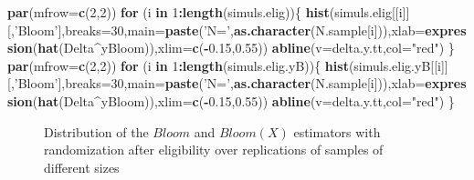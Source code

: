 \documentclass[]{book}
\newenvironment{Shaded}{\begin{snugshade}}{\end{snugshade}}
\newcommand{\ControlFlowTok}[1]{\textcolor[rgb]{0.13,0.29,0.53}{\textbf{#1}}}
\newcommand{\DataTypeTok}[1]{\textcolor[rgb]{0.13,0.29,0.53}{#1}}
\newcommand{\DecValTok}[1]{\textcolor[rgb]{0.00,0.00,0.81}{#1}}
\newcommand{\FloatTok}[1]{\textcolor[rgb]{0.00,0.00,0.81}{#1}}
\newcommand{\KeywordTok}[1]{\textcolor[rgb]{0.13,0.29,0.53}{\textbf{#1}}}
\newcommand{\NormalTok}[1]{#1}
\newcommand{\OperatorTok}[1]{\textcolor[rgb]{0.81,0.36,0.00}{\textbf{#1}}}
\newcommand{\StringTok}[1]{\textcolor[rgb]{0.31,0.60,0.02}{#1}}
\theoremstyle{definition}
\theoremstyle{definition}
\theoremstyle{definition}
\theoremstyle{remark}
\begin{document}
\begin{Shaded}
\begin{Highlighting}[]
\KeywordTok{par}\NormalTok{(}\DataTypeTok{mfrow=}\KeywordTok{c}\NormalTok{(}\DecValTok{2}\NormalTok{,}\DecValTok{2}\NormalTok{))}
\ControlFlowTok{for}\NormalTok{ (i }\ControlFlowTok{in} \DecValTok{1}\OperatorTok{:}\KeywordTok{length}\NormalTok{(simuls.elig))\{}
  \KeywordTok{hist}\NormalTok{(simuls.elig[[i]][,}\StringTok{'Bloom'}\NormalTok{],}\DataTypeTok{breaks=}\DecValTok{30}\NormalTok{,}\DataTypeTok{main=}\KeywordTok{paste}\NormalTok{(}\StringTok{'N='}\NormalTok{,}\KeywordTok{as.character}\NormalTok{(N.sample[i])),}\DataTypeTok{xlab=}\KeywordTok{expression}\NormalTok{(}\KeywordTok{hat}\NormalTok{(Delta}\OperatorTok{^}\NormalTok{yBloom)),}\DataTypeTok{xlim=}\KeywordTok{c}\NormalTok{(}\OperatorTok{-}\FloatTok{0.15}\NormalTok{,}\FloatTok{0.55}\NormalTok{))}
  \KeywordTok{abline}\NormalTok{(}\DataTypeTok{v=}\NormalTok{delta.y.tt,}\DataTypeTok{col=}\StringTok{"red"}\NormalTok{)}
\NormalTok{\}}
\KeywordTok{par}\NormalTok{(}\DataTypeTok{mfrow=}\KeywordTok{c}\NormalTok{(}\DecValTok{2}\NormalTok{,}\DecValTok{2}\NormalTok{))}
\ControlFlowTok{for}\NormalTok{ (i }\ControlFlowTok{in} \DecValTok{1}\OperatorTok{:}\KeywordTok{length}\NormalTok{(simuls.elig.yB))\{}
  \KeywordTok{hist}\NormalTok{(simuls.elig.yB[[i]][,}\StringTok{'Bloom'}\NormalTok{],}\DataTypeTok{breaks=}\DecValTok{30}\NormalTok{,}\DataTypeTok{main=}\KeywordTok{paste}\NormalTok{(}\StringTok{'N='}\NormalTok{,}\KeywordTok{as.character}\NormalTok{(N.sample[i])),}\DataTypeTok{xlab=}\KeywordTok{expression}\NormalTok{(}\KeywordTok{hat}\NormalTok{(Delta}\OperatorTok{^}\NormalTok{yBloom)),}\DataTypeTok{xlim=}\KeywordTok{c}\NormalTok{(}\OperatorTok{-}\FloatTok{0.15}\NormalTok{,}\FloatTok{0.55}\NormalTok{))}
  \KeywordTok{abline}\NormalTok{(}\DataTypeTok{v=}\NormalTok{delta.y.tt,}\DataTypeTok{col=}\StringTok{"red"}\NormalTok{)}
\NormalTok{\}}
\end{Highlighting}
\end{Shaded}

\begin{figure}[htbp]

{\centering {}

}

\caption{Distribution of the $Bloom$ and $Bloom(X)$ estimators with randomization after eligibility over replications of samples of different sizes}\label{fig:montecarlohisteligbloom}
\end{figure}
\end{document}
